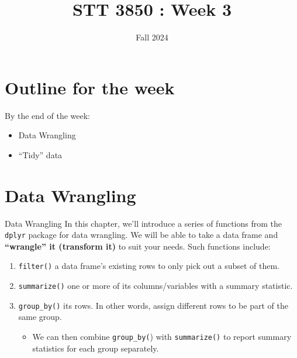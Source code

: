 \documentclass[
  ignorenonframetext,
]{beamer}
\title{STT 3850 : Week 3}
\author{Fall 2024}
\date{}
\institute{Appalachian State University}
\providecommand{\tightlist}{%
  \setlength{\itemsep}{0pt}\setlength{\parskip}{0pt}}
\begin{document}
\frame{\titlepage}

\hypertarget{outline-for-the-week}{%
\section{Outline for the week}\label{outline-for-the-week}}

\begin{frame}{By the end of the week:}
\protect\hypertarget{by-the-end-of-the-week}{}
\begin{itemize}
\tightlist
\item
  Data Wrangling
\item
  ``Tidy'' data
\end{itemize}
\end{frame}

\hypertarget{data-wrangling}{%
\section{Data Wrangling}\label{data-wrangling}}

\begin{frame}[fragile]{Data Wrangling}
\protect\hypertarget{data-wrangling-1}{}
In this chapter, we'll introduce a series of functions from the
\texttt{dplyr} package for data wrangling. We will be able to take a
data frame and \textbf{``wrangle'' it (transform it)} to suit your
needs. Such functions include:

\begin{enumerate}
\item
  \texttt{filter()} a data frame's existing rows to only pick out a
  subset of them.
\item
  \texttt{summarize()} one or more of its columns/variables with a
  summary statistic.
\item
  \texttt{group\_by()} its rows. In other words, assign different rows
  to be part of the same group.

  \begin{itemize}
  \tightlist
  \item
    We can then combine \texttt{group\_by(}) with \texttt{summarize()}
    to report summary statistics for each group separately.
  \end{itemize}
\end{enumerate}
\end{frame}
\end{document}
